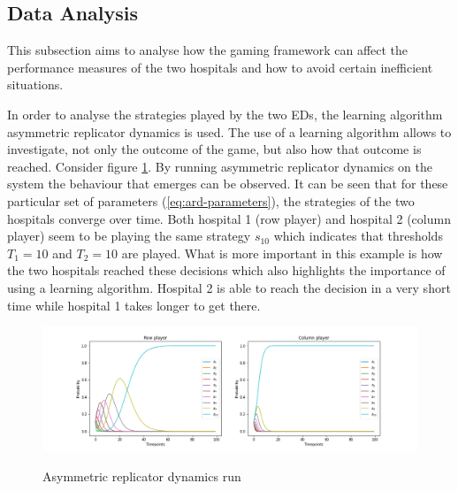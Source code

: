 \subsection{Data Analysis}

This subsection aims to analyse how the gaming framework can affect the 
performance measures of the two hospitals and how to avoid certain inefficient 
situations.

In order to analyse the strategies played by the two EDs, the learning algorithm
asymmetric replicator dynamics is used.
The use of a learning algorithm allows to investigate, not only the outcome of 
the game, but also how that outcome is reached.
Consider figure \ref{fig:ard-by-itself}. 
By running asymmetric replicator dynamics on the system the behaviour that 
emerges can be observed.
It can be seen that for these particular set of parameters 
(\ref{eq:ard-parameters}), the strategies of the two hospitals converge over 
time. 
Both hospital 1 (row player) and hospital 2 (column player) seem to be playing 
the same strategy \(s_10\) which indicates that thresholds \(T_1 = 10\) and 
\(T_2 = 10\) are played.
What is more important in this example is how the two hospitals reached these
decisions which also highlights the importance of using a learning algorithm.
Hospital 2 is able to reach the decision in a very short time while hospital 1
takes longer to get there.

\begin{figure}[H]
    \centering
    \includegraphics[scale=0.4, trim=120 0 120 0]{imgs/asymmetric_rd/asymmetric_rd.png}
    \label{fig:ard-by-itself}
    \caption{Asymmetric replicator dynamics run}
\end{figure}



